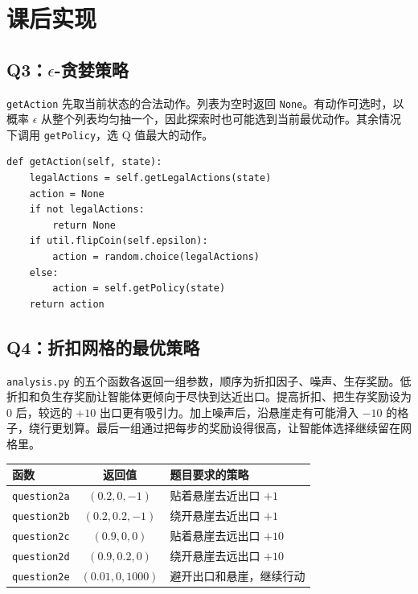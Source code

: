 \documentclass[UTF8,fontset=fandol,a4paper,11pt]{ctexart}
\newcommand{\code}[1]{\texttt{#1}}
\begin{document}
\section{课后实现}

\subsection{Q3：\texorpdfstring{$\epsilon$}{ε}-贪婪策略}

\code{getAction} 先取当前状态的合法动作。列表为空时返回 \code{None}。有动作可选时，以概率 $\epsilon$ 从整个列表均匀抽一个，因此探索时也可能选到当前最优动作。其余情况下调用 \code{getPolicy}，选 Q 值最大的动作。
\begin{lstlisting}
def getAction(self, state):
    legalActions = self.getLegalActions(state)
    action = None
    if not legalActions:
        return None
    if util.flipCoin(self.epsilon):
        action = random.choice(legalActions)
    else:
        action = self.getPolicy(state)
    return action
\end{lstlisting}

\newpage
\subsection{Q4：折扣网格的最优策略}

\code{analysis.py} 的五个函数各返回一组参数，顺序为折扣因子、噪声、生存奖励。低折扣和负生存奖励让智能体更倾向于尽快到达近出口。提高折扣、把生存奖励设为 0 后，较远的 $+10$ 出口更有吸引力。加上噪声后，沿悬崖走有可能滑入 $-10$ 的格子，绕行更划算。最后一组通过把每步的奖励设得很高，让智能体选择继续留在网格里。

\begin{center}
  \small
  \renewcommand{\arraystretch}{1.18}
  \begin{tabularx}{0.95\linewidth}{@{}l c Y@{}}
    \toprule
    函数 & 返回值 & 题目要求的策略 \\
    \midrule
    \code{question2a} & $(0.2,0,-1)$   & 贴着悬崖去近出口 $+1$ \\
    \code{question2b} & $(0.2,0.2,-1)$ & 绕开悬崖去近出口 $+1$ \\
    \code{question2c} & $(0.9,0,0)$    & 贴着悬崖去远出口 $+10$ \\
    \code{question2d} & $(0.9,0.2,0)$  & 绕开悬崖去远出口 $+10$ \\
    \code{question2e} & $(0.01,0,1000)$ & 避开出口和悬崖，继续行动 \\
    \bottomrule
  \end{tabularx}
\end{center}
\end{document}
